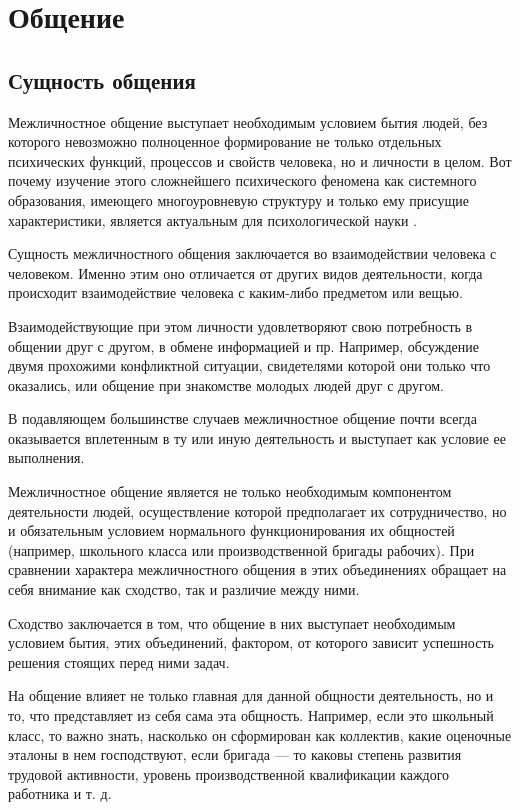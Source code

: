 \chapter{Общение}
\section{Сущность общения}
Межличностное общение выступает необходимым условием бытия людей, без которого невозможно полноценное формирование не только отдельных психических функций, процессов и свойств человека, но и личности в целом. Вот почему изучение этого сложнейшего психического феномена как системного образования, имеющего многоуровневую структуру и только ему присущие характеристики, является актуальным для психологической науки \cite{5}. 

Сущность межличностного общения заключается во взаимодействии человека с человеком. Именно этим оно отличается от других видов деятельности, когда происходит взаимодействие человека с каким-либо предметом или вещью.

Взаимодействующие при этом личности удовлетворяют свою потребность в общении друг с другом, в обмене информацией и пр. Например, обсуждение двумя прохожими конфликтной ситуации, свидетелями которой они только что оказались, или общение при знакомстве молодых людей друг с другом.

В подавляющем большинстве случаев межличностное общение почти всегда оказывается вплетенным в ту или иную деятельность и выступает как условие ее выполнения.

Межличностное общение является не только необходимым компонентом деятельности людей, осуществление которой предполагает их сотрудничество, но и обязательным условием нормального функционирования их общностей (например, школьного класса или производственной бригады рабочих). При сравнении характера межличностного общения в этих объединениях обращает на себя внимание как сходство, так и различие между ними.

Сходство заключается в том, что общение в них выступает необходимым условием бытия, этих объединений, фактором, от которого зависит успешность решения стоящих перед ними задач.

На общение влияет не только главная для данной общности деятельность, но и то, что представляет из себя сама эта общность. Например, если это школьный класс, то важно знать, насколько он сформирован как коллектив, какие оценочные эталоны в нем господствуют, если бригада — то каковы степень развития трудовой активности, уровень производственной квалификации каждого работника и т. д.

